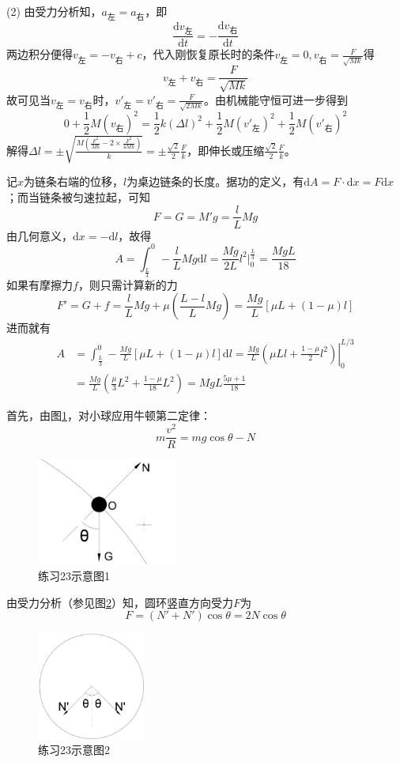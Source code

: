 \documentclass[b5paper,opensource,sourcefont,parskip]{qyxf-book}
\newcommand{\di}[1]{\mathrm{d}#1}
\newcommand{\dy}[2]{\frac{\di{#1}}{\di{#2}}}
\begin{document}
(2) 由受力分析知，$a_{\text{左}}=a_{\text{右}}$，即
\[\dy{v_{\text{左}}}{t}=-\dy{v_{\text{右}}}{t}\]
两边积分便得$v_{\text{左}}=-v_{\text{右}}+c$，代入刚恢复原长时的条件$v_{\text{左}}=0,v_{\text{右}}=\frac{F}{\sqrt{Mk}}$得
\[v_{\text{左}}+v_{\text{右}}=\frac{F}{\sqrt{Mk}}\]
故可见当$v_{\text{左}}=v_{\text{右}}$时，$v'_{\text{左}}=v'_{\text{右}}=\frac{F}{\sqrt{2Mk}}$。由机械能守恒可进一步得到
\[0+\frac{1}{2}M(v_{\text{右}})^2=\frac{1}{2}k(\Delta l)^2+\frac{1}{2}M(v'_{\text{左}})^2+\frac{1}{2}M(v'_{\text{右}})^2\]
解得$\Delta l=\pm\sqrt{\frac{M\left(\frac{F^2}{Mk}-2\times\frac{F^2}{4Mk}\right)}{k}}=\pm\frac{\sqrt{2}}{2}\frac{F}{k}$，即伸长或压缩$\frac{\sqrt{2}}{2}\frac{F}{k}$。


\solve 记$x$为链条右端的位移，$l$为桌边链条的长度。据功的定义，有$\di{A}=F\cdot\di{x}=F\di{x}$；而当链条被匀速拉起，可知
\[F=G=M'g=\frac{l}{L}Mg\]
由几何意义，$\di{x}=-\di{l}$，故得
\[
A=\int_{\frac{L}{3}}^{0} -\frac{l}{L}Mg\di{l}
=\frac{Mg}{2L}l^2\left.\right|_{0}^{\frac{L}{3}}
=\frac{MgL}{18}
\]
如果有摩擦力$f$，则只需计算新的力
\[
F'=G+f=\frac{l}{L}Mg+\mu\left(\frac{L-l}{L}Mg\right)=\frac{Mg}{L}[\mu L+(1-\mu)l]
\]
进而就有
\begin{align*}
A&=\int_{\frac{L}{3}}^{0} -\frac{Mg}{L}[\mu L+(1-\mu)l] \di{l}=\frac{Mg}{L}\left.\left(\mu Ll+\frac{1-\mu}{2}l^2\right)\right|_{0}^{L/3}\\
&=\frac{Mg}{L}\left(\frac{\mu}{3}L^2+\frac{1-\mu}{18}L^2\right)=MgL\frac{5\mu +1}{18}
\end{align*}


\solve 首先，由图\ref{fig:t23-1}，对小球应用牛顿第二定律：
\[m\dfrac{v^2}{R}=mg\cos\theta-N\]

\begin{figure}[htbp]
	\centering
	\includegraphics[height=100pt]{Chp2_illus2.png}
	\caption{练习23示意图1}\label{fig:t23-1}
\end{figure}

由受力分析（参见图\ref{fig:t23-2}）知，圆环竖直方向受力$F$为
\[
F=(N'+N')\cos\theta=2N\cos\theta
\]

\begin{figure}[htbp]
	\centering
	\includegraphics[height=100pt]{Chp2_illus3.png}
	\caption{练习23示意图2}\label{fig:t23-2}
\end{figure}
\end{document}
